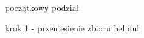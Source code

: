 \newpage
\begin{figure}[h]
\begin{subfigure}{\textwidth}
    \centering
    \caption[short]{początkowy podział}
\end{subfigure}%

\begin{subfigure}{.5\textwidth}
    \centering
    \caption[short]{krok 1 - przeniesienie zbioru helpful}
\end{subfigure}
\begin{subfigure}{.5\textwidth}
    \centering

\end{subfigure}
\end{figure}

